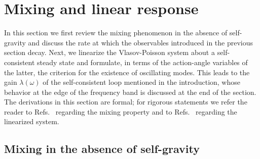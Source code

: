 \section{Mixing and linear response}
\label{Sec:Linear}

In this section we first review the mixing phenomenon in the absence of self-gravity and discuss the rate at which the observables introduced in the previous section decay. Next, we linearize the Vlasov-Poisson system about a self-consistent steady state and formulate, in terms of the action-angle variables of the latter, the criterion for the existence of oscillating modes. This leads to the gain $\lambda(\omega)$ of the self-consistent loop mentioned in the introduction, whose behavior at the edge of the frequency band is discussed at the end of the section. The derivations in this section are formal; for rigorous statements we refer the reader to Refs.~\cite{cM19,pRoS20} regarding the mixing property and to Refs.~\cite{mHgRcS22,Kunze-Book,mHgRmScS25,mMpRhV26} regarding the linearized system.


\subsection{Mixing in the absence of self-gravity}
\label{SubSec:FreeMixing}

